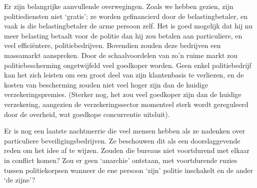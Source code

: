 \documentclass[
  a5paper,
  smalldemyvopaper,10pt,twoside,onecolumn,openright,extrafontsizes,hidelinks]{memoir}
\begin{document}
Er zijn belangrijke aanvullende overwegingen. Zoals we hebben gezien,
zijn politiediensten niet `gratis'; ze worden gefinancierd door de
belastingbetaler, en vaak is die belastingbetaler de arme persoon zelf.
Het is goed mogelijk dat hij nu meer belasting betaalt voor de politie
dan hij zou betalen aan particuliere, en veel efficiëntere,
politiebedrijven. Bovendien zouden deze bedrijven een massamarkt
aanspreken. Door de schaalvoordelen van zo'n ruime markt zou
politiebescherming ongetwijfeld veel goedkoper worden. Geen enkel
politiebedrijf kan het zich leisten om een groot deel van zijn
klantenbasis te verliezen, en de kosten van bescherming zouden niet veel
hoger zijn dan de huidige verzekeringspremies. (Sterker nog, het zou
veel goedkoper zijn dan de huidige verzekering, aangezien de
verzekeringssector momenteel sterk wordt gereguleerd door de overheid,
wat goedkope concurrentie uitsluit).

Er is nog een laatste nachtmerrie die veel mensen hebben als ze nadenken
over particuliere beveiligingsbedrijven. Ze beschouwen dit als een
doorslaggevende reden om het idee af te wijzen. Zouden die bureaus niet
voortdurend met elkaar in conflict komen? Zou er geen `anarchie'
ontstaan, met voortdurende ruzies tussen politiekorpsen wanneer de ene
persoon `zijn' politie inschakelt en de ander `de zijne'?
\end{document}
